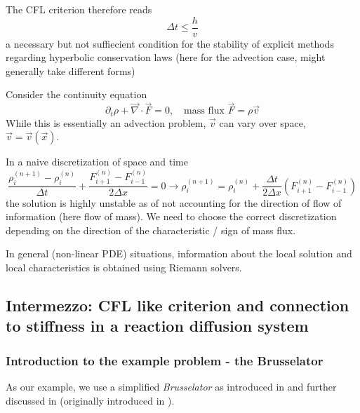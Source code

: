 \begin{mdframed}
The CFL criterion therefore reads
\begin{equation}
    \Delta t \leq \frac{h}{v}
\end{equation}
a necessary but not suffiecient condition for the stability of explicit methods regarding
hyperbolic conservation laws (here for the advection case, might generally take different forms)
\end{mdframed}


Consider the continuity equation
\begin{equation}
    \partial_t \rho + \vec{\nabla} \cdot \vec{F} = 0, \quad \text{mass flux } \vec{F} = \rho \vec{v}
\end{equation}
While this is essentially an advection problem, $\vec{v}$ can vary over space, $\vec{v} = \vec{v}(\vec{x})$.

In a naive discretization of space and time
\begin{equation}
    \frac{\rho_i^{(n+1)}-\rho_i^{(n)}}{\Delta t}+\frac{F_{i+1}^{(n)}-F_{i-1}^{(n)}}{2 \Delta x}=0 \rightarrow \rho_i^{(n+1)}=\rho_i^{(n)}+\frac{\Delta t}{2 \Delta x}\left(F_{i+1}^{(n)}-F_{i-1}^{(n)}\right)
\end{equation}
\textcolor{red1}{the solution is highly unstable as of not accounting for the direction
of flow of information (here flow of mass)}. We need to \textcolor{green1}{choose the
correct discretization} depending on the direction of the characteristic / sign of mass flux.

In general (non-linear PDE) situations, information about the local solution and
local characteristics is obtained using Riemann solvers.

\subsection{Intermezzo: CFL like criterion and connection to stiffness in a reaction diffusion system}
\subsubsection*{Introduction to the example problem - the Brusselator}
As our example, we use a simplified \textit{Brusselator} as introduced in \cite[chapter I.16]{hairer93} and further discussed in \cite[chapter IV.1]{Hairer1996} (originally introduced in \cite{lefever71}).

